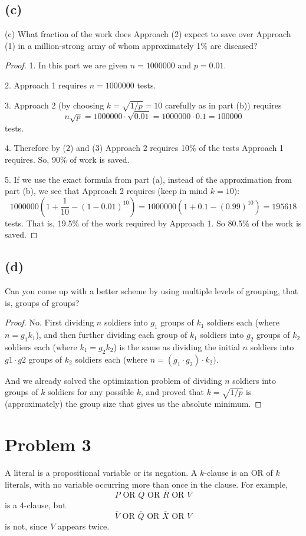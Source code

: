 \documentclass[14pt]{extarticle}
\begin{document}
\subsection{(c)}
(c) What fraction of the work does Approach (2) expect to save over Approach (1) in a million-strong army of whom approximately 1$\%$ are diseased?
\begin{proof}
1. In this part we are given $n = 1000000$ and $p = 0.01$.

2. Approach 1 requires $n = 1000000$ tests.

3. Approach 2 (by choosing $k = \sqrt{1/p} = 10$ carefully as in part (b)) requires 
$$
n\sqrt{p} = 1000000 \cdot \sqrt{0.01} = 1000000 \cdot 0.1 = 100000
$$ 
tests.

4. Therefore by (2) and (3) Approach 2 requires 10\% of the tests Approach 1 requires. So, 90\% of work is saved.

5. If we use the exact formula from part (a), instead of the approximation from part (b), we see that Approach 2 requires (keep in mind $k = 10$):
$$
1000000(1 + \frac{1}{10} - (1-0.01)^{10}) = 1000000(1 + 0.1 - (0.99)^{10}) = 195618
$$
tests. That is, 19.5\% of the work required by Approach 1. So 80.5\% of the work is saved.
\end{proof}

\subsection{(d)}
Can you come up with a better scheme by using multiple levels of grouping, that is, groups of groups?
\begin{proof}
No. First dividing $n$ soldiers into $g_1$ groups of $k_1$ soldiers each (where $n = g_1k_1$), and then further dividing each group of $k_1$ soldiers into $g_2$ groups of $k_2$ soldiers each (where $k_1 = g_2k_2$) is the same as dividing the initial $n$ soldiers into $g1\cdot g2$ groups of $k_2$ soldiers each (where $n = (g_1\cdot g_2) \cdot k_2)$.

And we already solved the optimization problem of dividing $n$ soldiers into groups of $k$ soldiers for any possible $k$, and proved that $k = \sqrt{1/p}$ is (approximately) the group size that gives us the absolute minimum.
\end{proof}

\section{Problem 3}
A literal is a propositional variable or its negation. A $k$-clause is an OR of $k$ literals, with no variable occurring more than once in the clause. For example,
$$
P \text{ OR } \overline{Q} \text{ OR } \overline{R} \text{ OR } V
$$
is a 4-clause, but
$$
\overline{V} \text{ OR } \overline{Q} \text{ OR } \overline{X} \text{ OR } V
$$
is not, since $V$ appears twice.
\end{document}
